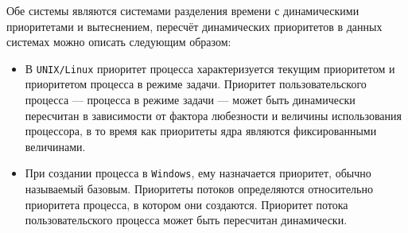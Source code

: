 \documentclass[a4paper,12pt]{bmstu}
\begin{document}
Обе системы являются системами разделения времени с динамическими приоритетами и вытеснением, пересчёт динамических приоритетов в данных системах можно описать следующим образом:
\begin{itemize}
    \item В \texttt{UNIX/Linux} приоритет процесса характеризуется текущим приоритетом и приоритетом процесса в режиме задачи. Приоритет пользовательского процесса --- процесса в режиме задачи --- может быть динамически пересчитан в зависимости от фактора любезности и величины использования процессора, в то время как приоритеты ядра являются фиксированными величинами.
    \item При создании процесса в \texttt{Windows}, ему назначается приоритет, обычно называемый базовым. Приоритеты потоков определяются относительно приоритета процесса, в котором они создаются. Приоритет потока пользовательского процесса может быть пересчитан динамически.
\end{itemize}
\end{document}
